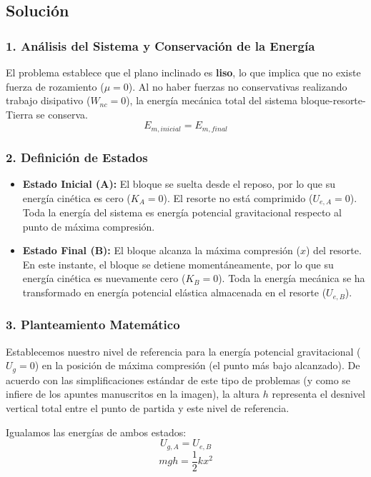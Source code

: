\documentclass[12pt, a4paper]{article}
\begin{document}
\subsection*{Solución}

\subsubsection*{1. Análisis del Sistema y Conservación de la Energía}
El problema establece que el plano inclinado es \textbf{liso}, lo que implica que no existe fuerza de rozamiento ($\mu = 0$). Al no haber fuerzas no conservativas realizando trabajo disipativo ($W_{nc} = 0$), la energía mecánica total del sistema bloque-resorte-Tierra se conserva.
$$E_{m, inicial} = E_{m, final}$$

\subsubsection*{2. Definición de Estados}
\begin{itemize}
    \item \textbf{Estado Inicial (A):} El bloque se suelta desde el reposo, por lo que su energía cinética es cero ($K_A = 0$). El resorte no está comprimido ($U_{e, A} = 0$). Toda la energía del sistema es energía potencial gravitacional respecto al punto de máxima compresión.
    \item \textbf{Estado Final (B):} El bloque alcanza la máxima compresión ($x$) del resorte. En este instante, el bloque se detiene momentáneamente, por lo que su energía cinética es nuevamente cero ($K_B = 0$). Toda la energía mecánica se ha transformado en energía potencial elástica almacenada en el resorte ($U_{e, B}$).
\end{itemize}

\subsubsection*{3. Planteamiento Matemático}
Establecemos nuestro nivel de referencia para la energía potencial gravitacional ($U_g = 0$) en la posición de máxima compresión (el punto más bajo alcanzado). De acuerdo con las simplificaciones estándar de este tipo de problemas (y como se infiere de los apuntes manuscritos en la imagen), la altura $h$ representa el desnivel vertical total entre el punto de partida y este nivel de referencia.
    
Igualamos las energías de ambos estados:
$$U_{g, A} = U_{e, B}$$
$$mgh = \frac{1}{2} k x^2$$
\end{document}
